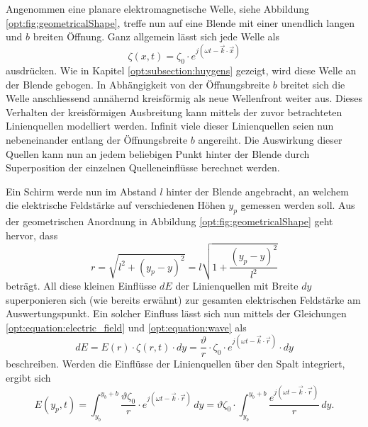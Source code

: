 Angenommen eine planare elektromagnetische Welle, siehe Abbildung \ref{opt:fig:geometricalShape}, treffe nun auf eine Blende mit einer unendlich langen und $b$ breiten Öffnung.
Ganz allgemein lässt sich jede Welle als
\begin{equation}
\zeta(x, t)
=
\zeta_0 \cdot e^{j(\omega t - \vec{k}\cdot\vec{x})}
\label{opt:equation:wave}
\end{equation}
ausdrücken.
Wie in Kapitel \ref{opt:subsection:huygens} gezeigt, wird diese Welle an der Blende gebogen.
In Abhängigkeit von der Öffnungsbreite $b$ breitet sich die Welle anschliessend annähernd kreisförmig als neue Wellenfront weiter aus.
Dieses Verhalten der kreisförmigen Ausbreitung kann mittels der zuvor betrachteten Linienquellen modelliert werden.
Infinit viele dieser Linienquellen seien nun nebeneinander entlang der Öffnungsbreite $b$ angereiht.
Die Auswirkung dieser Quellen kann nun an jedem beliebigen Punkt hinter der Blende durch Superposition der einzelnen Quelleneinflüsse berechnet werden.

Ein Schirm werde nun im Abstand $l$ hinter der Blende angebracht, an welchem die elektrische Feldstärke auf verschiedenen Höhen $y_p$ gemessen werden soll.
Aus der geometrischen Anordnung in Abbildung \ref{opt:fig:geometricalShape} geht hervor, dass
\begin{equation}
r
=
\sqrt{l^2 + (y_p-y)^2}
=
l \sqrt{1 + \frac{(y_p-y)^2}{l^2}}
\label{opt:equation:distance_r}
\end{equation}
beträgt. All diese kleinen Einflüsse $dE$ der Linienquellen mit Breite $dy$ superponieren sich (wie bereits erwähnt) zur gesamten elektrischen Feldstärke am Auswertungspunkt.
Ein solcher Einfluss lässt sich nun mittels der Gleichungen \eqref{opt:equation:electric_field} und \eqref{opt:equation:wave} als
\begin{equation*}
dE
=
E(r) \cdot \zeta(r, t) \cdot dy
=
\frac{\vartheta}{r} \cdot \zeta_0 \cdot e^{j(\omega t - \vec{k}\cdot\vec{r})} \cdot dy
\end{equation*}
beschreiben.
Werden die Einflüsse der Linienquellen über den Spalt integriert, ergibt sich
\begin{equation*}
E(y_p, t)
=
\int_{y_b}^{y_b+b}\frac{\vartheta\zeta_0}{r} \cdot e^{j(\omega t - \vec{k}\cdot\vec{r})} \,dy
=
\vartheta\zeta_0 \cdot \int_{y_b}^{y_b+b}\frac{e^{j(\omega t - \vec{k}\cdot\vec{r})}}{r} \,dy
.
\end{equation*}

